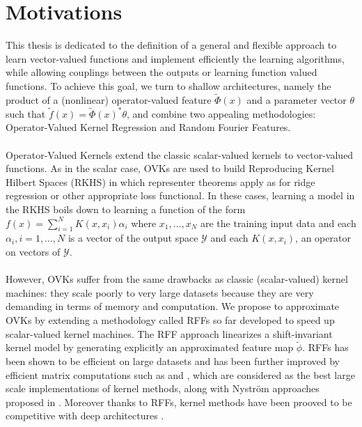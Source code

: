 \section{Motivations}
This thesis is dedicated to the definition of a general and flexible approach
to learn vector-valued functions and implement efficiently the learning
algorithms, while allowing couplings between the outputs or learning function
valued functions. To achieve this goal, we turn to shallow architectures,
namely the product of a (nonlinear) operator-valued feature $\tilde{\Phi}(x)$
and a parameter vector $\theta$ such that $\tilde{f}(x) = \tilde{\Phi}(x)^*
\theta$, and combine two appealing methodologies: Operator-Valued Kernel
Regression and Random Fourier Features.
\paragraph{}
Operator-Valued Kernels \citep{Micchelli2005,Carmeli2010,Alvarez2012} extend
the classic scalar-valued kernels to vector-valued functions. As in the scalar
case, \acfp{OVK} are used to build Reproducing Kernel
Hilbert Spaces (\acs{RKHS}) in which representer theorems apply as for ridge
regression or other appropriate loss functional. In these cases, learning a
model in the \acs{RKHS} boils down to learning a function of the form
$f(x)=\sum_{i=1}^N K(x,x_i)\alpha_i$ where $x_1, \ldots, x_N$ are the training
input data and each $\alpha_i, i=1, \ldots, N$ is a vector of the output space
$\mathcal{Y}$ and each $K(x,x_i)$, an operator on vectors of $\mathcal{Y}$.
\paragraph{}
However, \acsp{OVK} suffer from the same drawbacks as classic (scalar-valued)
kernel machines: they scale poorly to very large datasets because they are very
demanding in terms of memory and computation. We propose to approximate OVKs by
extending a methodology called \acfp{RFF} \citep{Rahimi2007, Le2013, Alacarte,
sriper2015, Bach2015, sutherland2015, rudi2016generalization} so far developed
to speed up scalar-valued kernel machines. The \acs{RFF} approach linearizes a
shift-invariant kernel model by generating explicitly an approximated feature
map $\tilde{\phi}$. \acsp{RFF} has been shown to be efficient on large datasets
and has been further improved by efficient matrix computations such as
\citep[``FastFood'']{Le2013} and \citep[``SORF'']{felix2016orthogonal}, which
are considered as the best large scale implementations of kernel methods, along
with Nystr\"om approaches proposed in \citet{drineas2005nystrom}. Moreover
thanks to \acsp{RFF}, kernel methods have been prooved to be competitive with
deep architectures \citep{lu2014scale, dai2014scalable, yang2015deep}.

